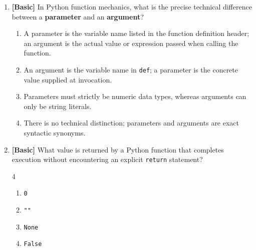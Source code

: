 \documentclass[11pt,a4paper]{article}
\begin{document}
\begin{enumerate}[label=\textbf{Q\arabic*.},leftmargin=1.8em,itemsep=0.8pt,topsep=0.3pt,resume]
\item \textbf{[Basic]} In Python function mechanics, what is the precise technical difference between a \textbf{parameter} and an \textbf{argument}?
\begin{enumerate}[label=\Alph*.,leftmargin=1.8em]
  \item A parameter is the variable name listed in the function definition header; an argument is the actual value or expression passed when calling the function.
  \item An argument is the variable name in \texttt{def}; a parameter is the concrete value supplied at invocation.
  \item Parameters must strictly be numeric data types, whereas arguments can only be string literals.
  \item There is no technical distinction; parameters and arguments are exact syntactic synonyms.
\end{enumerate}

\item \textbf{[Basic]} What value is returned by a Python function that completes execution without encountering an explicit \texttt{return} statement?
\begin{multicols}{4}
\begin{enumerate}[label=\Alph*.]
  \item \texttt{0}
  \item \texttt{""}
  \item \texttt{None}
  \item \texttt{False}
\end{enumerate}
\end{multicols}

\end{enumerate}

\newpage

\end{document}
